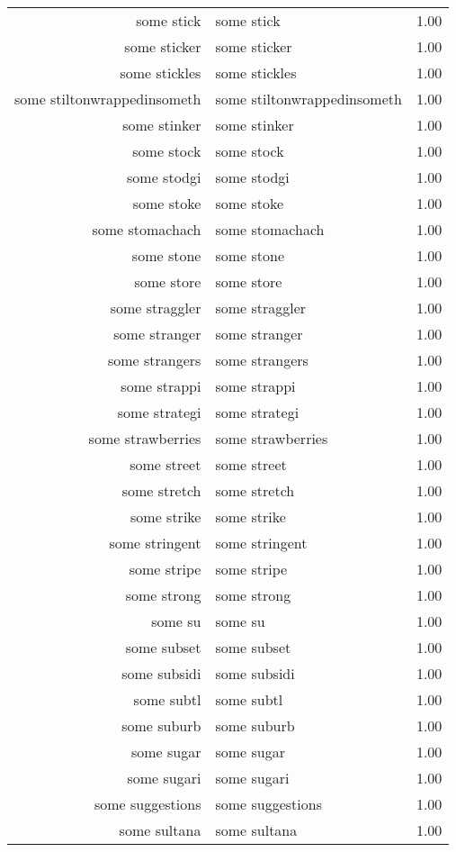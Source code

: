 \begin{table}[ht]
\begin{tabular}{rlr}
  some stick & some stick & 1.00 \\ 
  some sticker & some sticker & 1.00 \\ 
  some stickles & some stickles & 1.00 \\ 
  some stiltonwrappedinsometh & some stiltonwrappedinsometh & 1.00 \\ 
  some stinker & some stinker & 1.00 \\ 
  some stock & some stock & 1.00 \\ 
  some stodgi & some stodgi & 1.00 \\ 
  some stoke & some stoke & 1.00 \\ 
  some stomachach & some stomachach & 1.00 \\ 
  some stone & some stone & 1.00 \\ 
  some store & some store & 1.00 \\ 
  some straggler & some straggler & 1.00 \\ 
  some stranger & some stranger & 1.00 \\ 
  some strangers & some strangers & 1.00 \\ 
  some strappi & some strappi & 1.00 \\ 
  some strategi & some strategi & 1.00 \\ 
  some strawberries & some strawberries & 1.00 \\ 
  some street & some street & 1.00 \\ 
  some stretch & some stretch & 1.00 \\ 
  some strike & some strike & 1.00 \\ 
  some stringent & some stringent & 1.00 \\ 
  some stripe & some stripe & 1.00 \\ 
  some strong & some strong & 1.00 \\ 
  some su & some su & 1.00 \\ 
  some subset & some subset & 1.00 \\ 
  some subsidi & some subsidi & 1.00 \\ 
  some subtl & some subtl & 1.00 \\ 
  some suburb & some suburb & 1.00 \\ 
  some sugar & some sugar & 1.00 \\ 
  some sugari & some sugari & 1.00 \\ 
  some suggestions & some suggestions & 1.00 \\ 
  some sultana & some sultana & 1.00 \\ 

\end{tabular}
\end{table}
